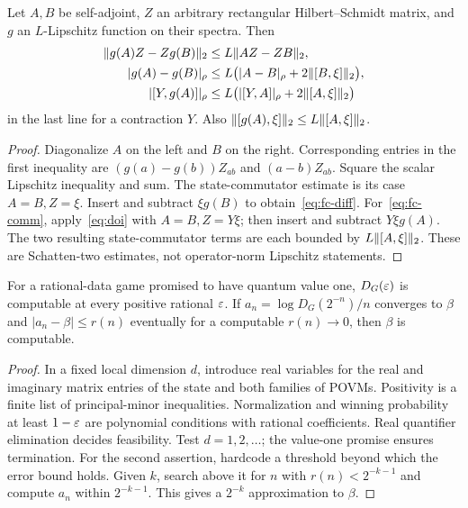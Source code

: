 \begin{lemma}\label{lem:fc}
Let $A,B$ be self-adjoint, $Z$ an arbitrary rectangular Hilbert--Schmidt matrix, and $g$ an $L$-Lipschitz function on their spectra. Then
\begin{align}
 \lVert g(A)Z-Zg(B)\rVert_2&\le L\lVert AZ-ZB\rVert_2,\label{eq:doi}\\
 |g(A)-g(B)|_\rho&\le L\bigl(|A-B|_\rho+2\lVert[B,\xi]\rVert_2\bigr),\label{eq:fc-diff}\\
 |[Y,g(A)]|_\rho&\le L\bigl(|[Y,A]|_\rho+2\lVert[A,\xi]\rVert_2\bigr)\label{eq:fc-comm}
\end{align}
in the last line for a contraction $Y$. Also $\lVert[g(A),\xi]\rVert_2\le L\lVert[A,\xi]\rVert_2$.
\end{lemma}
\begin{proof}
Diagonalize $A$ on the left and $B$ on the right. Corresponding entries in the first inequality are $(g(a)-g(b))Z_{ab}$ and $(a-b)Z_{ab}$. Square the scalar Lipschitz inequality and sum. The state-commutator estimate is its case $A=B,Z=\xi$. Insert and subtract $\xi g(B)$ to obtain~\eqref{eq:fc-diff}. For~\eqref{eq:fc-comm}, apply~\eqref{eq:doi} with $A=B,Z=Y\xi$; then insert and subtract $Y\xi g(A)$. The two resulting state-commutator terms are each bounded by $L\lVert[A,\xi]\rVert_2$. These are Schatten-two estimates, not operator-norm Lipschitz statements.
\end{proof}

\begin{lemma}\label{lem:computability}
For a rational-data game promised to have quantum value one, $D_G(\varepsilon)$ is computable at every positive rational $\varepsilon$. If $a_n=\log D_G(2^{-n})/n$ converges to $\beta$ and $|a_n-\beta|\le r(n)$ eventually for a computable $r(n)\to0$, then $\beta$ is computable.
\end{lemma}
\begin{proof}
In a fixed local dimension $d$, introduce real variables for the real and imaginary matrix entries of the state and both families of POVMs. Positivity is a finite list of principal-minor inequalities. Normalization and winning probability at least $1-\varepsilon$ are polynomial conditions with rational coefficients. Real quantifier elimination decides feasibility. Test $d=1,2,\ldots$; the value-one promise ensures termination. For the second assertion, hardcode a threshold beyond which the error bound holds. Given $k$, search above it for $n$ with $r(n)<2^{-k-1}$ and compute $a_n$ within $2^{-k-1}$. This gives a $2^{-k}$ approximation to $\beta$.
\end{proof}
